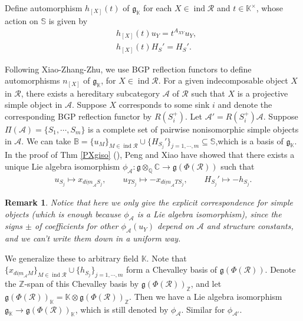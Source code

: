 \documentclass[12pt]{amsart}
\newtheorem{remark}[theorem]{Remark}
\begin{document}
Define automorphism $h_{[X]}(t) $ of $\mathfrak{g}_{\mathbb{K}}$ for each $X\in \operatorname{ind} \mathcal{R}$ and $t\in \mathbb{K}^{\times}$, whose action on $\mathbb{S}$ is given by 
\begin{align*}
   &h_{[X]}(t)u_{Y} = t^{A_{XY}} u_{Y}, \\
   &h_{[X]}(t)H_{S}' = H_{S}'.
\end{align*}

Following Xiao-Zhang-Zhu\cite{BGP}, we use BGP reflection functors to define automorphisms $n_{[X]}$ of $\mathfrak{g}_{\mathbb{K}}$, for $X \in \operatorname{ind} \mathcal{R}$.
For a given indecomposable object $X$ in $\mathcal{R}$, there exists a hereditary subcategory $\mathcal{A}$ of $\mathcal{R}$ such that $X$ is a projective simple object in $\mathcal{A}$.
Suppose $X$ corresponds to some sink $i$ and denote the corresponding BGP reflection functor by $R(S_i^+)$.
Let $\mathcal{A}'=R(S_i^+) \mathcal{A}$. 
Suppose $\Pi(\mathcal{A})=\{S_1,\cdots ,S_m\}$ is a complete set of pairwise nonisomorphic simple objects in $\mathcal{A}$.
We can take $\mathbb{B} = \{ u_M \}_{M\in \operatorname{ind}\mathcal{R}} \cup \{ H_{S_j}' \}_{j=1,\cdots,m} \subseteq \mathbb{S}$,which is a basis of $\mathfrak{g}_{\mathbb{K}}$.
In the proof of Thm \ref{PXgiso} (\cite[Thm 4.2]{1997ROOT}), Peng and Xiao have showed that there exists a unique Lie algebra isomorphism $\phi_{\mathcal{A}}:\mathfrak{g}\otimes_{\mathbb{Q}}\mathbb{C} \rightarrow \mathfrak{g}(\Phi(\mathcal{R}))$ such that
\begin{align*}
    u_{S_j} \mapsto x_{\underline{dim}_{\mathcal{A}}S_j}, \qquad u_{TS_j} \mapsto -x_{\underline{dim}_{\mathcal{A}}TS_j}, \qquad H_{S_j}' \mapsto -h_{S_j}.
\end{align*}

\begin{remark}
    Notice that here we only give the explicit correspondence for simple objects (which is enough because $\phi_{\mathcal{A}}$ is a Lie algebra isomorphism), since the signs $\pm$ of coefficients for other $\phi_{\mathcal{A}}(u_Y)$ depend on $\mathcal{A}$ and structure constants, and we can't write them down in a uniform way.
\end{remark}


We generalize these to arbitrary field $\mathbb{K}$.
Note that $\{ x_{\underline{dim}_{\mathcal{A}}M} \}_{M\in \operatorname{ind}\mathcal{R}} \cup \{ h_{S_j} \}_{j=1,\cdots,m}$ form a Chevalley basis of $\mathfrak{g}(\Phi(\mathcal{R}))$. 
Denote the $\mathbb{Z}$-span of this Chevalley basis by $\mathfrak{g}(\Phi(\mathcal{R}))_{\mathbb{Z}}$, and let $\mathfrak{g}(\Phi(\mathcal{R}))_{\mathbb{K}} = \mathbb{K} \otimes \mathfrak{g}(\Phi(\mathcal{R}))_{\mathbb{Z}}$.
Then we have a Lie algebra isomorphism $\mathfrak{g}_{\mathbb{K}}\rightarrow \mathfrak{g}(\Phi(\mathcal{R}))_{\mathbb{K}}$, which is still denoted by $\phi_{\mathcal{A}}$.
Similar for $\phi_{\mathcal{A}'}$. 
\end{document}
